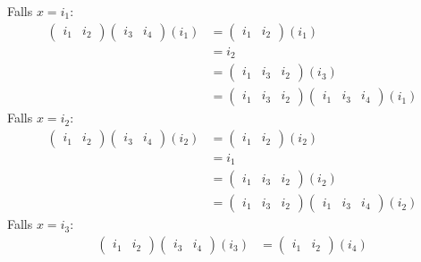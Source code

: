 \documentclass[sectionformat = aufgabe]{gadsescript}
\begin{document}
\begin{enumerate}[label=(\alph*)]
\begin{description}
\[				\]
				Falls $ x = i_1 $:
				\begin{align*}
					\begin{pmatrix} i_1 & i_2 \end{pmatrix} \begin{pmatrix} i_3 & i_4 \end{pmatrix} (i_1) &= \begin{pmatrix} i_1 & i_2 \end{pmatrix} (i_1) \\
					~ & = i_2 \\
					~ & = \begin{pmatrix} i_1 & i_3 & i_2 \end{pmatrix} (i_3) \\
					~ & = \begin{pmatrix} i_1 & i_3 & i_2 \end{pmatrix} \begin{pmatrix} i_1 & i_3 & i_4 \end{pmatrix} (i_1)
				\end{align*}
				Falls $ x = i_2 $:
				\begin{align*}
					\begin{pmatrix} i_1 & i_2 \end{pmatrix} \begin{pmatrix} i_3 & i_4 \end{pmatrix} (i_2) &= \begin{pmatrix} i_1 & i_2 \end{pmatrix} (i_2) \\
					~ & = i_1 \\
					~ & = \begin{pmatrix} i_1 & i_3 & i_2 \end{pmatrix} (i_2) \\
					~ & = \begin{pmatrix} i_1 & i_3 & i_2 \end{pmatrix} \begin{pmatrix} i_1 & i_3 & i_4 \end{pmatrix} (i_2)
				\end{align*}
				Falls $ x = i_3 $:
				\begin{align*}
					\begin{pmatrix} i_1 & i_2 \end{pmatrix} \begin{pmatrix} i_3 & i_4 \end{pmatrix} (i_3) &= \begin{pmatrix} i_1 & i_2 \end{pmatrix} (i_4) \\

\end{align*}
\end{description}
\end{enumerate}
\end{document}

